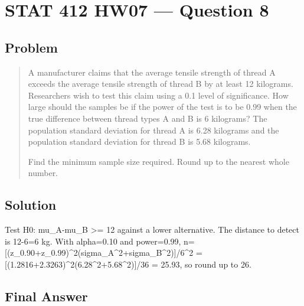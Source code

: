 \documentclass[11pt]{article}
\begin{document}
\section*{STAT 412 HW07 --- Question 8}

\subsection*{Problem}

\begin{quote}
A manufacturer claims that the average tensile strength of thread A exceeds the average tensile strength of thread B by at least 12 kilograms. Researchers wish to test this claim using a 0.1 level of significance. How large should the samples be if the power of the test is to be 0.99 when the true difference between thread types A and B is 6 kilograms? The population standard deviation for thread A is 6.28 kilograms and the population standard deviation for thread B is 5.68 kilograms.

Find the minimum sample size required. Round up to the nearest whole number.
\end{quote}

\subsection*{Solution}

Test H0: mu\_A-mu\_B >= 12 against a lower alternative. The distance to detect is 12-6=6 kg. With alpha=0.10 and power=0.99, n=[(z\_0.90+z\_0.99)\textasciicircum{}2(sigma\_A\textasciicircum{}2+sigma\_B\textasciicircum{}2)]/6\textasciicircum{}2 = [(1.2816+2.3263)\textasciicircum{}2(6.28\textasciicircum{}2+5.68\textasciicircum{}2)]/36 = 25.93, so round up to 26.

\subsection*{Final Answer}

\end{document}

